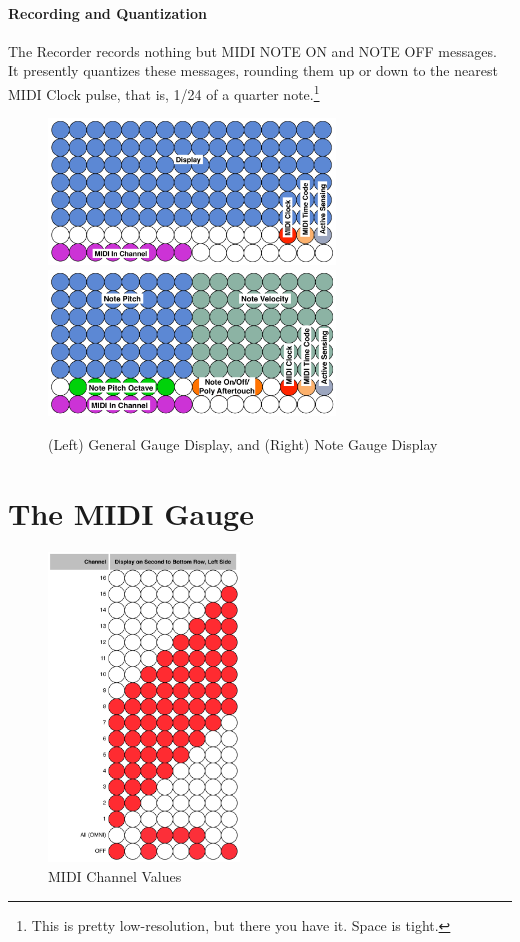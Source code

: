 \documentclass{article}
\begin{document}
\paragraph{Recording and Quantization}

The Recorder records nothing but MIDI NOTE ON and NOTE OFF messages.  It presently quantizes these messages, rounding them up or down to the nearest MIDI Clock pulse, that is, 1/24 of a quarter note.\footnote{This is pretty low-resolution, but there you have it.  Space is tight.}


\clearpage

\vspace{2em}
\begin{figure}[h!]
\begin{center}
\includegraphics[width=3in]{GeneralGauge.pdf}~\includegraphics[width=3in]{NoteGauge.pdf}
\caption{\small (Left) General Gauge Display, and (Right) Note Gauge Display}
\label{gaugedisplays} \end{center}
\vspace{-3em}\end{figure}


\section {The MIDI Gauge}


\begin{figure}
\vspace{-1.5em}\includegraphics[width=2in]{midichannel.pdf}
\vspace{-2em}\caption{\small MIDI Channel Values}
\label{midichannelvalues}
\end{figure}
\end{document}
